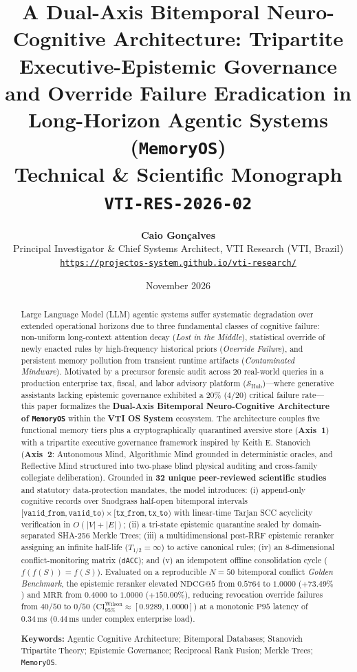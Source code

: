 \documentclass[10pt,twocolumn]{article}
\title{\textbf{A Dual-Axis Bitemporal Neuro-Cognitive Architecture: Tripartite Executive-Epistemic Governance and Override Failure Eradication in Long-Horizon Agentic Systems (\texttt{MemoryOS})}\\[0.4em]
\large Technical \& Scientific Monograph \texttt{VTI-RES-2026-02}}
\author{\textbf{Caio Gon\c{c}alves}\\
\small Principal Investigator \& Chief Systems Architect, VTI Research (VTI, Brazil)\\
\small \href{https://projectos-system.github.io/vti-research/}{\texttt{https://projectos-system.github.io/vti-research/}}}
\date{November 2026}
\begin{document}
\maketitle

\begin{abstract}
Large Language Model (LLM) agentic systems suffer systematic degradation over extended operational horizons due to three fundamental classes of cognitive failure: non-uniform long-context attention decay (\emph{Lost in the Middle}), statistical override of newly enacted rules by high-frequency historical priors (\emph{Override Failure}), and persistent memory pollution from transient runtime artifacts (\emph{Contaminated Mindware}). Motivated by a precursor forensic audit across $20$ real-world queries in a production enterprise tax, fiscal, and labor advisory platform ($\mathcal{S}_{\mathrm{Hub}}$)---where generative assistants lacking epistemic governance exhibited a $20\%$ ($4/20$) critical failure rate---this paper formalizes the \textbf{Dual-Axis Bitemporal Neuro-Cognitive Architecture of \texttt{MemoryOS}} within the \textbf{VTI OS System} ecosystem. The architecture couples five functional memory tiers plus a cryptographically quarantined aversive store (\textbf{Axis~1}) with a tripartite executive governance framework inspired by Keith E. Stanovich (\textbf{Axis~2}: Autonomous Mind, Algorithmic Mind grounded in deterministic oracles, and Reflective Mind structured into two-phase blind physical auditing and cross-family collegiate deliberation). Grounded in \textbf{32 unique peer-reviewed scientific studies} and statutory data-protection mandates, the model introduces: (i) append-only cognitive records over Snodgrass half-open bitemporal intervals $[\texttt{valid\_from}, \texttt{valid\_to}) \times [\texttt{tx\_from}, \texttt{tx\_to})$ with linear-time Tarjan SCC acyclicity verification in $O(|V| + |E|)$; (ii) a tri-state epistemic quarantine sealed by domain-separated SHA-256 Merkle Trees; (iii) a multidimensional post-RRF epistemic reranker assigning an infinite half-life ($T_{1/2} = \infty$) to active canonical rules; (iv) an 8-dimensional conflict-monitoring matrix (\texttt{dACC}); and (v) an idempotent offline consolidation cycle ($f(f(S)) = f(S)$). Evaluated on a reproducible $N = 50$ bitemporal conflict \emph{Golden Benchmark}, the epistemic reranker elevated $\mathrm{NDCG@5}$ from $0.5764$ to $1.0000$ ($+73.49\%$) and $\mathrm{MRR}$ from $0.4000$ to $1.0000$ ($+150.00\%$), reducing revocation override failures from $40/50$ to $0/50$ ($\mathrm{CI}_{95\%}^{\mathrm{Wilson}} \approx [0.9289, 1.0000]$) at a monotonic $\mathrm{P95}$ latency of $0.34\,\mathrm{ms}$ ($0.44\,\mathrm{ms}$ under complex enterprise load).

\vspace{0.4em}
\noindent\textbf{Keywords:} Agentic Cognitive Architecture; Bitemporal Databases; Stanovich Tripartite Theory; Epistemic Governance; Reciprocal Rank Fusion; Merkle Trees; \texttt{MemoryOS}.
\end{abstract}
\end{document}
